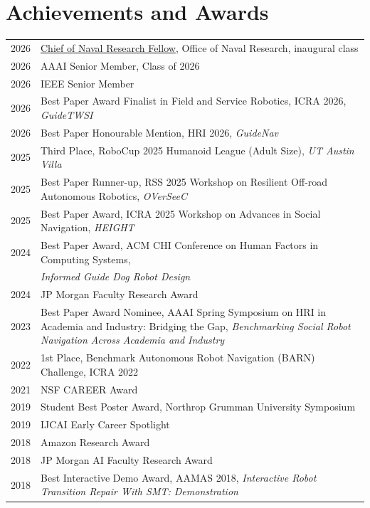 \documentclass[Times]{article}
\begin{document}
\section*{Achievements and Awards}
\begin{longtable}{@{}p{1.2cm} >{\raggedright\arraybackslash}p{\dimexpr\textwidth-1.2cm-2\tabcolsep\relax}@{}}
  2026  & \href{https://www.onr.navy.mil/media-center/news-releases/debut-dozen-onr-announces-first-winners-new-cnr-fellows-program}{Chief of Naval Research Fellow}, Office of Naval Research, inaugural class\\
  2026  & AAAI Senior Member, Class of 2026 \\
  2026  & IEEE Senior Member \\
  2026  & Best Paper Award Finalist in Field and Service Robotics, ICRA 2026, \emph{GuideTWSI} \\
  2026  & Best Paper Honourable Mention, HRI 2026, \emph{GuideNav} \\
  2025  & Third Place, RoboCup 2025 Humanoid League (Adult Size), \emph{UT Austin Villa}\\
  2025  & Best Paper Runner-up, RSS 2025 Workshop on Resilient Off-road Autonomous Robotics, \emph{OVerSeeC} \\
  2025  & Best Paper Award, ICRA 2025 Workshop on Advances in Social Navigation, \emph{HEIGHT} \\
  2024  & Best Paper Award, ACM CHI Conference on Human Factors in Computing Systems, \\
        & \emph{Informed Guide Dog Robot Design}  \\
  2024  & JP Morgan Faculty Research Award \\
  2023  & Best Paper Award Nominee, AAAI Spring Symposium on HRI in Academia and Industry: Bridging the Gap, \emph{Benchmarking Social Robot Navigation Across Academia and Industry} \\
  2022  & 1st Place, Benchmark Autonomous Robot Navigation (BARN) Challenge,
          ICRA 2022 \\
  2021  & NSF CAREER Award\\
  2019  & Student Best Poster Award, Northrop Grumman University Symposium \\
  2019  & IJCAI Early Career Spotlight \\
  2018  & Amazon Research Award \\
  2018  & JP Morgan AI Faculty Research Award \\
  2018  & Best Interactive Demo Award, AAMAS 2018, \emph{Interactive Robot Transition Repair With SMT: Demonstration} \\

\end{longtable}
\end{document}
